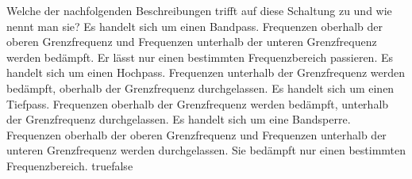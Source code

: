     {Welche der nachfolgenden Beschreibungen trifft auf diese Schaltung zu und wie nennt man sie? }
    {Es handelt sich um einen Bandpass. Frequenzen oberhalb der oberen Grenzfrequenz und Frequenzen unterhalb der unteren Grenzfrequenz werden bedämpft. Er lässt nur einen bestimmten Frequenzbereich passieren.}
    {Es handelt sich um einen Hochpass. Frequenzen unterhalb der Grenzfrequenz werden bedämpft, oberhalb der Grenzfrequenz durchgelassen.}
    {Es handelt sich um einen Tiefpass. Frequenzen oberhalb der Grenzfrequenz werden bedämpft, unterhalb der Grenzfrequenz durchgelassen.}
    {Es handelt sich um eine Bandsperre. Frequenzen oberhalb der oberen Grenzfrequenz und Frequenzen unterhalb der unteren Grenzfrequenz werden durchgelassen. Sie bedämpft nur einen bestimmten Frequenzbereich.}
    {true}{false}
